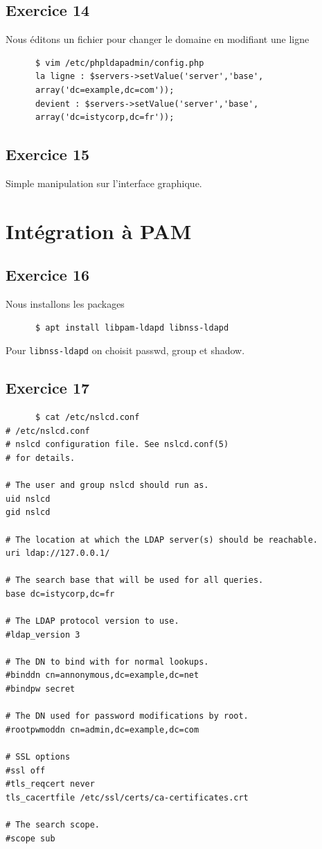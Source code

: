 \documentclass{report}
\begin{document}
\subsection{Exercice 14}
Nous éditons un fichier pour changer le domaine en modifiant une ligne
\begin{tcolorbox}
  \begin{verbatim}
      $ vim /etc/phpldapadmin/config.php
      la ligne : $servers->setValue('server','base',
      array('dc=example,dc=com'));
      devient : $servers->setValue('server','base',
      array('dc=istycorp,dc=fr'));
  \end{verbatim}
\end{tcolorbox}
\subsection{Exercice 15}
Simple manipulation sur l'interface graphique.
\section{Intégration à PAM}
\subsection{Exercice 16}
Nous installons les packages
\begin{tcolorbox}
  \begin{verbatim}
      $ apt install libpam-ldapd libnss-ldapd
  \end{verbatim}
\end{tcolorbox}
Pour \texttt{libnss-ldapd} on choisit passwd, group et shadow.
\subsection{Exercice 17}
\begin{tcolorbox}
  \begin{verbatim}
      $ cat /etc/nslcd.conf
# /etc/nslcd.conf
# nslcd configuration file. See nslcd.conf(5)
# for details.

# The user and group nslcd should run as.
uid nslcd
gid nslcd

# The location at which the LDAP server(s) should be reachable.
uri ldap://127.0.0.1/

# The search base that will be used for all queries.
base dc=istycorp,dc=fr

# The LDAP protocol version to use.
#ldap_version 3

# The DN to bind with for normal lookups.
#binddn cn=annonymous,dc=example,dc=net
#bindpw secret

# The DN used for password modifications by root.
#rootpwmoddn cn=admin,dc=example,dc=com

# SSL options
#ssl off
#tls_reqcert never
tls_cacertfile /etc/ssl/certs/ca-certificates.crt

# The search scope.
#scope sub
  \end{verbatim}
\end{tcolorbox}
\end{document}
